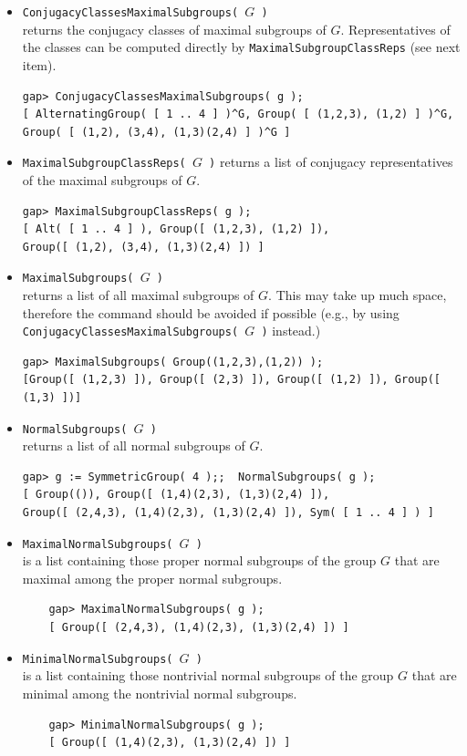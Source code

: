 \begin{itemize}
\item {\tt ConjugacyClassesMaximalSubgroups( $G$ )}\\
returns the conjugacy classes of maximal subgroups of $G$. Representatives of the
classes can be computed directly by {\tt MaximalSubgroupClassReps} (see next item).
{\codesize
\begin{verbatim}
gap> ConjugacyClassesMaximalSubgroups( g );
[ AlternatingGroup( [ 1 .. 4 ] )^G, Group( [ (1,2,3), (1,2) ] )^G,
Group( [ (1,2), (3,4), (1,3)(2,4) ] )^G ]
\end{verbatim}}

\item {\tt MaximalSubgroupClassReps( $G$ )}
returns a list of conjugacy representatives of the maximal subgroups of $G$.
{\codesize
\begin{verbatim}
gap> MaximalSubgroupClassReps( g );
[ Alt( [ 1 .. 4 ] ), Group([ (1,2,3), (1,2) ]),
Group([ (1,2), (3,4), (1,3)(2,4) ]) ]
\end{verbatim}}

\item {\tt MaximalSubgroups( $G$ )}\\
returns a list of all maximal subgroups of $G$. This may take up much space, therefore the command should
be avoided if possible (e.g., by using {\tt ConjugacyClassesMaximalSubgroups( $G$ )}
instead.)
{\codesize
\begin{verbatim}
gap> MaximalSubgroups( Group((1,2,3),(1,2)) );
[Group([ (1,2,3) ]), Group([ (2,3) ]), Group([ (1,2) ]), Group([ (1,3) ])]
\end{verbatim}}

\item {\tt NormalSubgroups( $G$ )}\\
returns a list of all normal subgroups of $G$.
{\codesize
\begin{verbatim}
gap> g := SymmetricGroup( 4 );;  NormalSubgroups( g );
[ Group(()), Group([ (1,4)(2,3), (1,3)(2,4) ]),
Group([ (2,4,3), (1,4)(2,3), (1,3)(2,4) ]), Sym( [ 1 .. 4 ] ) ]
\end{verbatim}}

\item {\tt MaximalNormalSubgroups( $G$ )}\\
is a list containing those proper normal subgroups of the group $G$ that are maximal among the proper
normal subgroups.
{\codesize
\begin{verbatim}
    gap> MaximalNormalSubgroups( g );
    [ Group([ (2,4,3), (1,4)(2,3), (1,3)(2,4) ]) ]
\end{verbatim}}

\item {\tt MinimalNormalSubgroups( $G$ )}\\
  is a list containing those nontrivial normal subgroups of the group $G$ that
  are minimal among the nontrivial normal subgroups.
{\codesize
\begin{verbatim}
    gap> MinimalNormalSubgroups( g );  
    [ Group([ (1,4)(2,3), (1,3)(2,4) ]) ]
\end{verbatim}}
\end{itemize}
\subsectionspace

